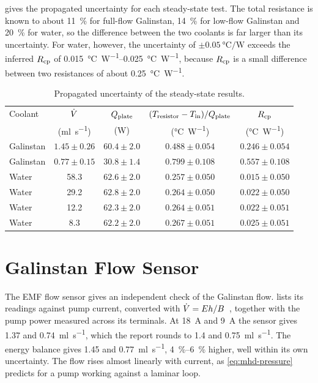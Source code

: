  gives the propagated uncertainty for each
steady-state test. The total resistance is known to about \SI{11}{\percent} for
full-flow Galinstan, \SI{14}{\percent} for low-flow Galinstan and
\SI{20}{\percent} for water, so the difference between the two coolants is far
larger than its uncertainty. For water, however, the uncertainty of
$\pm\SI{0.05}{\celsius\per\watt}$ exceeds the inferred $R_{\mathrm{cp}}$ of
\SIrange{0.015}{0.025}{\celsius\per\watt}, because $R_{\mathrm{cp}}$ is a small difference
between two resistances of about \SI{0.25}{\celsius\per\watt}.

\begin{table}[htbp]
  \centering
  \caption{Propagated uncertainty of the steady-state results.}
  \label{tab:app-uncertainty}
  \small
  \begin{tabular}{@{}lcccc@{}}
    \toprule
    Coolant & $\dot{V}$ & $Q_{\mathrm{plate}}$ & $(T_{\mathrm{resistor}} - T_{\mathrm{in}})/Q_{\mathrm{plate}}$ & $R_{\mathrm{cp}}$ \\
     & (\si{\milli\litre\per\second}) & (\si{\watt}) & (\si{\celsius\per\watt})
      & (\si{\celsius\per\watt}) \\
    \midrule
    Galinstan & $1.45 \pm 0.26$ & $60.4 \pm 2.0$ & $0.488 \pm 0.054$ & $0.246 \pm 0.054$ \\
    Galinstan & $0.77 \pm 0.15$ & $30.8 \pm 1.4$ & $0.799 \pm 0.108$ & $0.557 \pm 0.108$ \\
    Water     & 58.3            & $62.6 \pm 2.0$ & $0.257 \pm 0.050$ & $0.015 \pm 0.050$ \\
    Water     & 29.2            & $62.8 \pm 2.0$ & $0.264 \pm 0.050$ & $0.022 \pm 0.050$ \\
    Water     & 12.2\tnote{a}   & $62.3 \pm 2.0$ & $0.264 \pm 0.051$ & $0.022 \pm 0.051$ \\
    Water     & 8.3\tnote{a}    & $62.2 \pm 2.0$ & $0.267 \pm 0.051$ & $0.025 \pm 0.051$ \\
    \bottomrule
  \end{tabular}
\end{table}

\section{Galinstan Flow Sensor}

The EMF flow sensor gives an independent check of the Galinstan flow.
 lists its readings against pump current, converted with
$\dot{V} = Eh/B$~\cite{kwon_project_2025}, together with the pump power measured
across its terminals. At \SI{18}{\ampere} and \SI{9}{\ampere} the sensor gives
1.37 and \SI{0.74}{\milli\litre\per\second}, which the report rounds to 1.4 and
\SI{0.75}{\milli\litre\per\second}. The energy balance gives 1.45 and
\SI{0.77}{\milli\litre\per\second}, \SIrange{4}{6}{\percent} higher, well within
its own uncertainty. The flow rises almost linearly with current, as
\cref{eq:mhd-pressure} predicts for a pump working against a laminar loop.

